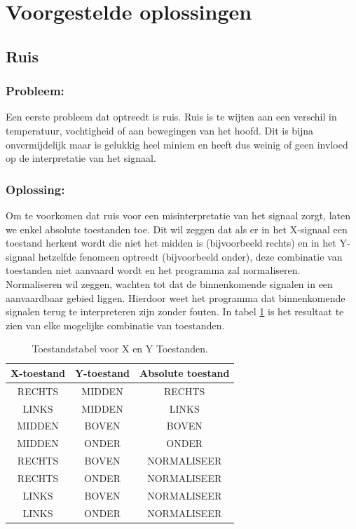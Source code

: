 \documentclass{article}
\begin{document}
\section{Voorgestelde oplossingen}
\subsection{Ruis}
\subsubsection{Probleem:}
Een eerste probleem dat optreedt is ruis. Ruis is te wijten aan een verschil in temperatuur, vochtigheid of aan bewegingen van het hoofd. Dit is bijna onvermijdelijk maar is gelukkig heel miniem en heeft dus weinig of geen invloed op de interpretatie van het signaal.
\subsubsection{Oplossing:}
Om te voorkomen dat ruis voor een misinterpretatie van het signaal zorgt, laten we enkel absolute toestanden toe. Dit wil zeggen dat als er in het X-signaal een toestand herkent wordt die niet het midden is (bijvoorbeeld rechts) en in het Y-signaal hetzelfde fenomeen optreedt (bijvoorbeeld onder), deze combinatie van toestanden niet aanvaard wordt en het programma zal normaliseren. Normaliseren wil zeggen, wachten tot dat de binnenkomende signalen in een aanvaardbaar gebied liggen. Hierdoor weet het programma dat binnenkomende signalen terug te interpreteren zijn zonder fouten. In tabel \ref{tbl:toestandstabel} is het resultaat te zien van elke mogelijke combinatie van toestanden.
\begin{table}[H]
	\centering
	\vspace{0.5cm}
	\begin{tabular}{|c|c||c|}
		\hline \textbf{X-toestand} & \textbf{Y-toestand} & \textbf{Absolute toestand} \\ 
		\hline RECHTS & MIDDEN & RECHTS \\ 
		\hline LINKS & MIDDEN & LINKS \\ 
		\hline MIDDEN & BOVEN & BOVEN \\ 
		\hline MIDDEN & ONDER & ONDER \\ 
		\hline RECHTS & BOVEN & NORMALISEER \\ 
		\hline RECHTS & ONDER & NORMALISEER \\ 
		\hline LINKS & BOVEN & NORMALISEER \\ 
		\hline LINKS & ONDER & NORMALISEER \\ 
		\hline 
	\end{tabular}
	\caption{Toestandstabel voor X en Y Toestanden.}
	\label{tbl:toestandstabel}
\end{table}
\end{document}
